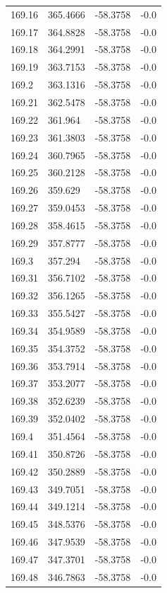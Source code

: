 \begin{table}[H]
\begin{tabular}{llll}
169.16 & 365.4666 & -58.3758 & -0.0 \\
169.17 & 364.8828 & -58.3758 & -0.0 \\
169.18 & 364.2991 & -58.3758 & -0.0 \\
169.19 & 363.7153 & -58.3758 & -0.0 \\
169.2 & 363.1316 & -58.3758 & -0.0 \\
169.21 & 362.5478 & -58.3758 & -0.0 \\
169.22 & 361.964 & -58.3758 & -0.0 \\
169.23 & 361.3803 & -58.3758 & -0.0 \\
169.24 & 360.7965 & -58.3758 & -0.0 \\
169.25 & 360.2128 & -58.3758 & -0.0 \\
169.26 & 359.629 & -58.3758 & -0.0 \\
169.27 & 359.0453 & -58.3758 & -0.0 \\
169.28 & 358.4615 & -58.3758 & -0.0 \\
169.29 & 357.8777 & -58.3758 & -0.0 \\
169.3 & 357.294 & -58.3758 & -0.0 \\
169.31 & 356.7102 & -58.3758 & -0.0 \\
169.32 & 356.1265 & -58.3758 & -0.0 \\
169.33 & 355.5427 & -58.3758 & -0.0 \\
169.34 & 354.9589 & -58.3758 & -0.0 \\
169.35 & 354.3752 & -58.3758 & -0.0 \\
169.36 & 353.7914 & -58.3758 & -0.0 \\
169.37 & 353.2077 & -58.3758 & -0.0 \\
169.38 & 352.6239 & -58.3758 & -0.0 \\
169.39 & 352.0402 & -58.3758 & -0.0 \\
169.4 & 351.4564 & -58.3758 & -0.0 \\
169.41 & 350.8726 & -58.3758 & -0.0 \\
169.42 & 350.2889 & -58.3758 & -0.0 \\
169.43 & 349.7051 & -58.3758 & -0.0 \\
169.44 & 349.1214 & -58.3758 & -0.0 \\
169.45 & 348.5376 & -58.3758 & -0.0 \\
169.46 & 347.9539 & -58.3758 & -0.0 \\
169.47 & 347.3701 & -58.3758 & -0.0 \\
169.48 & 346.7863 & -58.3758 & -0.0 \\

\end{tabular}
\end{table}

